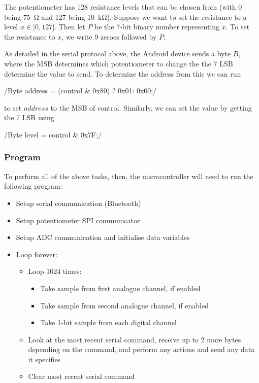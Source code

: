 The potentiometer has 128 resistance levels that can be chosen from (with 0
being \SI{75}{\ohm} and 127 being \SI{10}{\kilo\ohm}). Suppose we want to set
the resistance to a level $x \in \mathopen[0,127\mathclose]$. Then let $P$ be
the 7-bit binary number representing $x$. To set the resistance to $x$, we write
9 zeroes followed by $P$.

As detailed in the serial protocol above, the Android device sends a byte $B$,
where the MSB determines which potentiometer to change the the 7 LSB determine
the value to send. To determine the address from this we can run

/Byte address = (control & 0x80) ? 0x01: 0x00;/

to set $address$ to the MSB of control. Similarly, we can set the value by
getting the 7 LSB using

/Byte level = control & 0x7F;/


\subsubsection{Program}
To perform all of the above tasks, then, the microcontroller will need to run
the following program:

\begin{itemize}
  \item Setup serial communication (Bluetooth)
  \item Setup potentiometer SPI communicator
  \item Setup ADC communication and initialise data variables
  \item Loop forever:
    \begin{itemize}
      \item Loop 1024 times:
        \begin{itemize}
          \item Take sample from first analogue channel, if enabled
          \item Take sample from second analogue channel, if enabled
          \item Take 1-bit sample from each digital channel
        \end{itemize}
      \item Look at the most recent serial command, receive up to 2 more bytes
        depending on the command, and perform any actions and send any data it
        specifies
      \item Clear most recent serial command
    \end{itemize}
\end{itemize}

